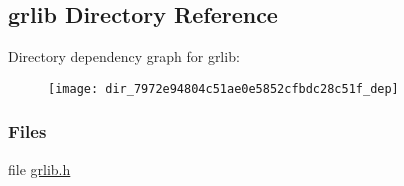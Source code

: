 \subsection{grlib Directory Reference}
\label{dir_7972e94804c51ae0e5852cfbdc28c51f}
Directory dependency graph for grlib\+:
\nopagebreak
\begin{figure}[H]
\begin{center}
\leavevmode
\texttt{[image: dir\_7972e94804c51ae0e5852cfbdc28c51f\_dep]}
\end{center}
\end{figure}
\subsubsection*{Files}
\begin{DoxyCompactItemize}
\item 
file \hyperlink{grlib_8h}{grlib.\+h}
\end{DoxyCompactItemize}
